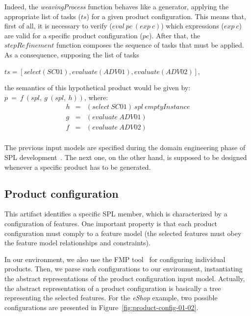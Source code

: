 \documentclass{acm_proc_article-sp}
\begin{document}
Indeed, the \emph{weavingProcess} function behaves like a generator, applying
the appropriate list of tasks ($ts$) for a given product configuration. This means 
that, first of all, it is necessary to verify  ($eval\ pc\ (exp\ c)$) which expressions ($exp\ c$) 
are valid for a specific product configuration ($pc$). After that, the
$stepRefinement$ function composes the sequence of tasks that must be applied. 
As a consequence, supposing the list of tasks
 
$ts=[select(SC01),evaluate(ADV01),evaluate(ADV02)]$,
 
the semantics of this hypothetical product would be given by: $p\ =\  f\ (spl,\ g\ (spl,\ h))$, where:
\begin{eqnarray*}
h  & = & (select\ SC01)\ spl\ emptyInstance \\
g  & = & (evaluate\ ADV01) \\
f   & = & (evaluate\ ADV02) \\
\end{eqnarray*}

{\color{red}The previous input models are specified during the domain
engineering phase of SPL development~\cite{Clements:2001aa,Pohl:2005aa}. The next
one, on the other hand, is supposed to be designed whenever a specific product
has to be generated. }

\subsection{Product configuration}\label{subsub:pc}

This artifact identifies a specific SPL member, which is characterized by a
configuration of features. One important property is that each product
configuration must comply to a feature model (the selected features must obey
the feature model relationships and constraints).

{\color{red}In our environment, we also use the FMP
tool~\cite{Czarnecki:2004aa} for configuring individual products. Then,
we parse such configurations to our
environment, instantiating the abstract representations of the product
configuration input model. Actually, the abstract representation of a product
configuration is basically a tree representing the selected features. For the
\emph{eShop} example, two possible configurations are presented in
Figure~\ref{fig:product-config-01-02}.}
\end{document}
